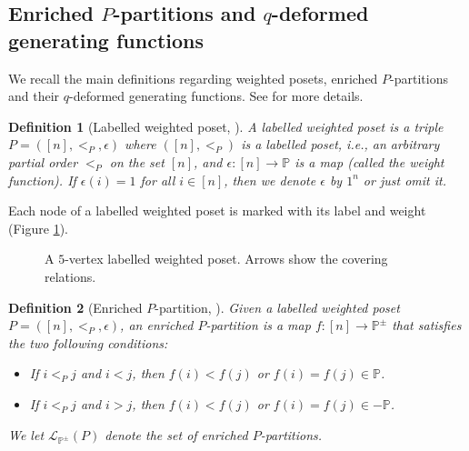 \documentclass[revision]{FPSAC2024}
\newtheorem{defn}{Definition}
\newcommand{\PP}{\mathbb{P}} %
\begin{document}
\subsection{Enriched $P$-partitions and $q$-deformed generating functions}
\label{sec : poset}
We recall the main definitions regarding weighted posets, enriched $P$-partitions and their $q$-deformed generating functions. See \cite{Ges84, GriVas21, GriVas22, Sta01, Ste97} for more details.   
\begin{defn}[Labelled weighted poset, \cite{GriVas21}]
A \emph{labelled weighted poset} is a triple $P = ([n],<_P,\epsilon)$ where $([n], <_P)$ is a \emph{labelled poset}, i.e., an arbitrary partial order $ <_P$ on the set $[n]$, and $\epsilon : [n]\longrightarrow \PP$ is a map (called the \emph{weight function}). If $\epsilon(i) = 1$ for all $i \in [n]$, then we denote $\epsilon$ by $1^n$ or just omit it.
\end{defn}
\noindent Each node of a labelled weighted poset is marked with its label and weight (Figure \ref{fig : poset}).
%
\begin{figure}[htbp]
\begin{center}
\end{center}
\caption{A $5$-vertex labelled weighted poset. Arrows show the covering relations.}
 \label{fig : poset}
 \end{figure}
 \begin{defn}[Enriched $P$-partition, \cite{Ste97}]\label{def : enriched}
Given a labelled weighted poset $P = ([n],<_P,\epsilon)$, an \emph{enriched $P$-partition} is a map $f: [n]\longrightarrow \PP^{\pm} $ that satisfies the two following conditions:
\begin{itemize}
\item[(i)] If $i <_P j$ and $i < j$, then $f(i) < f(j)$ or $f(i) = f(j) \in \PP$.
\item[(ii)] If $i <_P j$ and $i>j$, then $f(i) < f(j)$ or $f(i) = f(j) \in -\PP$.
\end{itemize}
We let $\mathcal{L}_{\PP^{\pm}}(P)$ denote the set of enriched $P$-partitions.
\end{defn}
\end{document}
